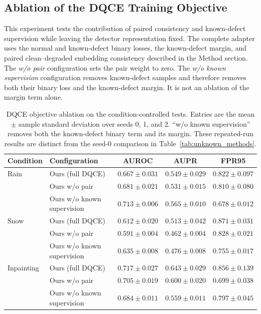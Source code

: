 \subsection{Ablation of the DQCE Training Objective}
\label{subsec:dqce_ablation_results}

This experiment tests the contribution of paired consistency and
known-defect supervision while leaving the detector representation fixed.
The complete adapter uses the normal and known-defect binary losses, the
known-defect margin, and paired clean--degraded embedding consistency
described in the Method section. The \emph{w/o pair} configuration sets the
pair weight to zero. The \emph{w/o known supervision} configuration removes
known-defect samples and therefore removes both their binary loss and the
known-defect margin. It is not an ablation of the margin term alone.

\begin{table}[!t]
  \centering
  \caption{DQCE objective ablation on the condition-controlled tests.
  Entries are the mean $\pm$ sample standard deviation over seeds 0, 1,
  and 2. ``w/o known supervision'' removes both the known-defect binary
  term and its margin. These repeated-run results are distinct from the
  seed-0 comparison in Table~\ref{tab:unknown_methods}.}
  \label{tab:dqce_ablation}
  {\QSDexpTableStyle
  \begin{tabular*}{\textwidth}{@{\extracolsep{\fill}}llccc@{}}
    \toprule
    Condition & Configuration & AUROC & AUPR & FPR95 \\
    \midrule
    Rain & Ours (full DQCE) & $0.667\pm0.031$ & $0.549\pm0.029$ & $0.822\pm0.097$ \\
         & Ours w/o pair & $0.681\pm0.021$ & $0.531\pm0.015$ & $0.810\pm0.080$ \\
         & Ours w/o known supervision & $0.713\pm0.006$ & $0.565\pm0.010$ & $0.678\pm0.012$ \\
    \midrule
    Snow & Ours (full DQCE) & $0.612\pm0.020$ & $0.513\pm0.042$ & $0.871\pm0.031$ \\
         & Ours w/o pair & $0.591\pm0.004$ & $0.462\pm0.004$ & $0.828\pm0.021$ \\
         & Ours w/o known supervision & $0.635\pm0.008$ & $0.476\pm0.008$ & $0.755\pm0.017$ \\
    \midrule
    Inpainting & Ours (full DQCE) & $0.717\pm0.027$ & $0.643\pm0.029$ & $0.856\pm0.139$ \\
         & Ours w/o pair & $0.705\pm0.019$ & $0.600\pm0.020$ & $0.699\pm0.038$ \\
         & Ours w/o known supervision & $0.684\pm0.011$ & $0.559\pm0.011$ & $0.797\pm0.045$ \\
    \bottomrule
  \end{tabular*}}
\end{table}

